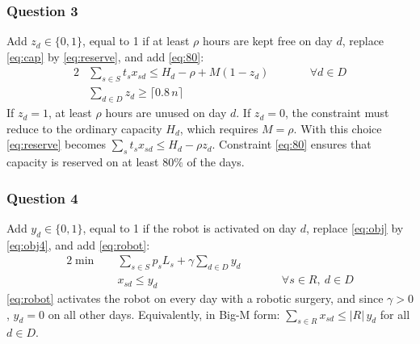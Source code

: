 \subsubsection*{Question 3}

Add $z_d \in \{0,1\}$, equal to 1 if at least $\rho$ hours are kept free on
day $d$, replace \eqref{eq:cap} by \eqref{eq:reserve}, and add \eqref{eq:80}:
\begin{alignat}{2}
& \sum_{s \in S} t_s x_{sd} \le H_d - \rho + M(1 - z_d) && \qquad \forall d \in D \label{eq:reserve}\\
& \sum_{d \in D} z_d \ge \lceil 0.8\, n \rceil && \label{eq:80}
\end{alignat}
If $z_d = 1$, at least $\rho$ hours are unused on day $d$. If $z_d = 0$, the
constraint must reduce to the ordinary capacity $H_d$, which requires
$M = \rho$. With this choice \eqref{eq:reserve} becomes
$\sum_{s} t_s x_{sd} \le H_d - \rho z_d$. Constraint \eqref{eq:80} ensures
that capacity is reserved on at least $80\%$ of the days.

\subsubsection*{Question 4}

Add $y_d \in \{0,1\}$, equal to 1 if the robot is activated on day $d$,
replace \eqref{eq:obj} by \eqref{eq:obj4}, and add \eqref{eq:robot}:
\begin{alignat}{2}
\min \quad & \sum_{s \in S} p_s L_s + \gamma \sum_{d \in D} y_d && \label{eq:obj4}\\
& x_{sd} \le y_d && \qquad \forall s \in R,\ d \in D \label{eq:robot}
\end{alignat}
\eqref{eq:robot} activates the robot on every day with a robotic surgery, and
since $\gamma > 0$, $y_d = 0$ on all other days. Equivalently, in Big-M form:
$\sum_{s \in R} x_{sd} \le |R|\, y_d$ for all $d \in D$.